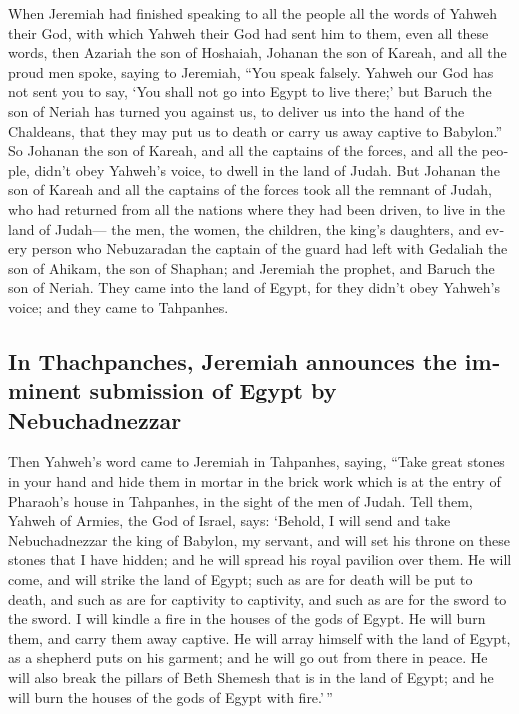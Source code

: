 \begin{paracol}{2}
\begin{otherlanguage}{english}
 When Jeremiah had finished speaking to all the people all
the words of Yahweh their God, with which Yahweh their God had sent him
to them, even all these words,  then Azariah the son of
Hoshaiah, Johanan the son of Kareah, and all the proud men spoke, saying
to Jeremiah, ``You speak falsely. Yahweh our God has not sent you to
say, `You shall not go into Egypt to live there;'  but
Baruch the son of Neriah has turned you against us, to deliver us into
the hand of the Chaldeans, that they may put us to death or carry us
away captive to Babylon.''  So Johanan the son of Kareah,
and all the captains of the forces, and all the people, didn't obey
Yahweh's voice, to dwell in the land of Judah.  But
Johanan the son of Kareah and all the captains of the forces took all
the remnant of Judah, who had returned from all the nations where they
had been driven, to live in the land of Judah---  the men,
the women, the children, the king's daughters, and every person who
Nebuzaradan the captain of the guard had left with Gedaliah the son of
Ahikam, the son of Shaphan; and Jeremiah the prophet, and Baruch the son
of Neriah.  They came into the land of Egypt, for they
didn't obey Yahweh's voice; and they came to Tahpanhes.

\hypertarget{in-thachpanches-jeremiah-announces-the-imminent-submission-of-egypt-by-nebuchadnezzar}{%
\subsection{In Thachpanches, Jeremiah announces the imminent submission
of Egypt by
Nebuchadnezzar}\label{in-thachpanches-jeremiah-announces-the-imminent-submission-of-egypt-by-nebuchadnezzar}}

 Then Yahweh's word came to Jeremiah in Tahpanhes, saying,
 ``Take great stones in your hand and hide them in mortar
in the brick work which is at the entry of Pharaoh's house in Tahpanhes,
in the sight of the men of Judah.  Tell them, Yahweh of
Armies, the God of Israel, says: `Behold, I will send and take
Nebuchadnezzar the king of Babylon, my servant, and will set his throne
on these stones that I have hidden; and he will spread his royal
pavilion over them.  He will come, and will strike the
land of Egypt; such as are for death will be put to death, and such as
are for captivity to captivity, and such as are for the sword to the
sword.  I will kindle a fire in the houses of the gods of
Egypt. He will burn them, and carry them away captive. He will array
himself with the land of Egypt, as a shepherd puts on his garment; and
he will go out from there in peace.  He will also break
the pillars of Beth Shemesh that is in the land of Egypt; and he will
burn the houses of the gods of Egypt with fire.'\,''


\end{otherlanguage}
\end{paracol}
